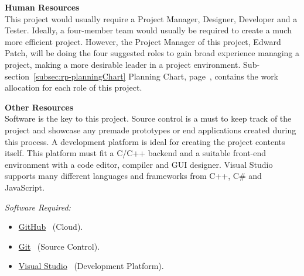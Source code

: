 \documentclass[conference]{IEEEtran}
\begin{document}
        \textbf{Human Resources}\\
          This project would usually require a Project Manager, Designer, Developer and a Tester. Ideally, a four-member team would usually be required to create a much more efficient project. However, the Project Manager of this project, Edward Patch, will be doing the four suggested roles to gain broad experience managing a project, making a more desirable leader in a project environment. Sub-section~\ref{subsec:rp-planningChart} Planning Chart, page~\pageref{subsec:rp-planningChart}, contains the work allocation for each role of this project.

        \textbf{Other Resources}\\
        Software is the key to this project. Source control is a must to keep track of the project and showcase any premade prototypes or end applications created during this process. A development platform is ideal for creating the project contents itself. This platform must fit a C/C++ backend and a suitable front-end environment with a code editor, compiler and GUI designer. Visual Studio supports many different languages and frameworks from C++, C\# and JavaScript.

        \textit{Software Required:}
        \begin{itemize}
          \item \href{https://github.com/}{GitHub}~\cite{github_github_nodate} (Cloud).
          \item \href{https://git-scm.com/}{Git}~\cite{git_git_nodate} (Source Control).
          \item \href{https://visualstudio.microsoft.com/}{Visual Studio}~\cite{microsoft_visual_nodate} (Development Platform).
        \end{itemize}
\end{document}
